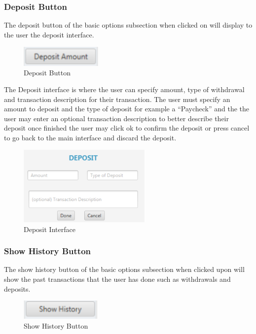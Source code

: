 \documentclass[12pt]{article}
\begin{document}
\subsubsection{Deposit Button}

The deposit button of the basic options subsection when clicked on will display to the user the deposit interface.

\begin{figure}[h!]
  \centering
  \includegraphics[width=40mm]{depositbutton.PNG}
  \caption{Deposit Button}
\end{figure}

The Deposit interface is where the user can specify amount, type of withdrawal and transaction description for their transaction. The user must specify an amount to deposit and the type of deposit for example a “Paycheck” and the the user may enter an optional transaction description to better describe their deposit once finished the user may click ok to confirm the deposit or press cancel to go back to the main interface and discard the deposit.

\begin{figure}[h!]
  \centering
  \includegraphics[width=65mm]{depositinterface.PNG}
  \caption{Deposit Interface}
\end{figure}

\subsubsection{Show History Button}
The show history button of the basic options subsection when clicked upon will show the past transactions that the user has done such as withdrawals and deposits.

\begin{figure}[h!]
  \centering
  \includegraphics[width=40mm]{showhistorybutton.PNG}
  \caption{Show History Button}
\end{figure}
\end{document}
